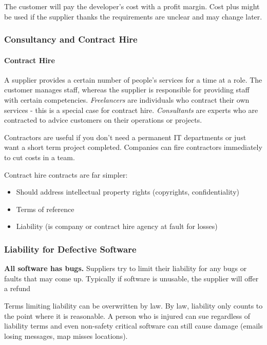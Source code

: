 The customer will pay the developer's cost with a profit margin.
Cost plus might be used if the supplier thanks the requirements are unclear and may change later.

\subsubsection{Consultancy and Contract Hire}\label{ssub:consultancy_and_contract_hire}

\paragraph{Contract Hire}\label{par:contract_hire}

A supplier provides a certain number of people's services for a time at a role.
The customer manages staff, whereas the supplier is responsible for providing staff with certain competencies.
\emph{Freelancers} are individuals who contract their own services - this is a special case for contract hire.
\emph{Consultants} are experts who are contracted to advice customers on their operations or projects.

Contractors are useful if you don't need a permanent IT departments or just want a short term project completed.
Companies can fire contractors immediately to cut costs in a team.

\medskip
\noindent
Contract hire contracts are far simpler:

\begin{itemize}
	\item Should address intellectual property rights (copyrights, confidentiality)
	\item Terms of reference
	\item Liability (is company or contract hire agency at fault for losses)
\end{itemize}

\subsubsection{Liability for Defective Software}\label{ssub:liability_for_defective_software}

\textbf{All software has bugs.}
Suppliers try to limit their liability for any bugs or faults that may come up.
Typically if software is unusable, the supplier will offer a refund

Terms limiting liability can be overwritten by law.
By law, liability only counts to the point where it is reasonable.
A person who is injured can sue regardless of liability terms and even non-safety critical software can still cause damage (emails losing messages, map misses locations).
